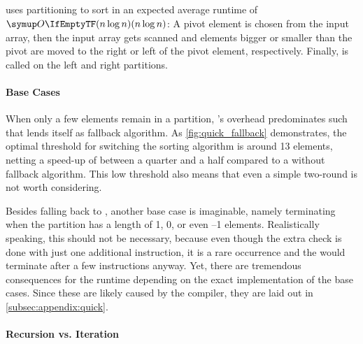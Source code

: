 \subsection{\texorpdfstring{\QS{}}{QuickSort}}


\QS{} uses partitioning to sort in an expected average runtime of \(\bigoh{n \log n}\):
A pivot element is chosen from the input array, then the input array gets scanned and elements bigger or smaller than the pivot are moved to the right or left of the pivot element, respectively.
Finally, \QS{} is called on the left and right partitions.

\paragraph{Base Cases}

When only a few elements remain in a partition, \QS{}'s overhead predominates such that \IS{} lends itself as fallback algorithm.
As \cref{fig:quick_fallback} demonstrates, the optimal threshold for switching the sorting algorithm is around 13 elements, netting a speed-up of between a quarter and a half compared to a \QS{} without fallback algorithm.
This low threshold also means that even a simple two-round \ShS{} is not worth considering.

Besides falling back to \IS{}, another base case is imaginable, namely terminating when the partition has a length of 1, 0, or even --1 elements.
Realistically speaking, this should not be necessary, because even though the extra check is done with just one additional instruction, it is a rare occurrence and the \IS{} would terminate after a few instructions anyway.
Yet, there are tremendous consequences for the runtime depending on the exact implementation of the base cases.
Since these are likely caused by the compiler, they are laid out in \cref{subsec:appendix:quick}.

\paragraph{Recursion vs. Iteration}

